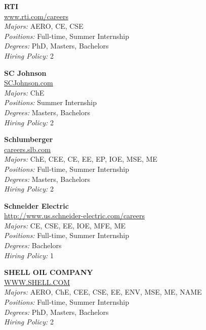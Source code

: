 \documentclass[twoside]{article}
\begin{document}
\begin{center}
\begin{multicols}{3}
\begin{minipage}{.9\columnwidth}{\Large\bf RTI }\\
	\url{www.rti.com/careers}\\
	\emph{Majors:} AERO, CE, CSE\\
	\emph{Positions:} Full-time, Summer Internship\\
	\emph{Degrees:} PhD, Masters, Bachelors\\
	\emph{Hiring Policy:} 2\\
\end{minipage}
 
\begin{minipage}{.9\columnwidth}{\Large\bf SC Johnson }\\
	\url{SCJohnson.com}\\
	\emph{Majors:} ChE\\
	\emph{Positions:} Summer Internship\\
	\emph{Degrees:} Masters, Bachelors\\
	\emph{Hiring Policy:} 2\\
\end{minipage}
 
\begin{minipage}{.9\columnwidth}{\Large\bf Schlumberger }\\
	\url{careers.slb.com}\\
	\emph{Majors:} ChE, CEE, CE, EE, EP, IOE, MSE, ME\\
	\emph{Positions:} Full-time, Summer Internship\\
	\emph{Degrees:} Masters, Bachelors\\
	\emph{Hiring Policy:} 2\\
\end{minipage}
 
\begin{minipage}{.9\columnwidth}{\Large\bf Schneider Electric }\\
	\url{http://www.us.schneider-electric.com/careers}\\
	\emph{Majors:} CE, CSE, EE, IOE, MFE, ME\\
	\emph{Positions:} Full-time, Summer Internship\\
	\emph{Degrees:} Bachelors\\
	\emph{Hiring Policy:} 1\\
\end{minipage}
 
\begin{minipage}{.9\columnwidth}{\Large\bf SHELL OIL COMPANY }\\
	\url{WWW.SHELL.COM}\\
	\emph{Majors:} AERO, ChE, CEE, CSE, EE, ENV, MSE, ME, NAME\\
	\emph{Positions:} Full-time, Summer Internship\\
	\emph{Degrees:} PhD, Masters, Bachelors\\
	\emph{Hiring Policy:} 2\\
\end{minipage}
 

\end{multicols}
\end{center}
\end{document}
